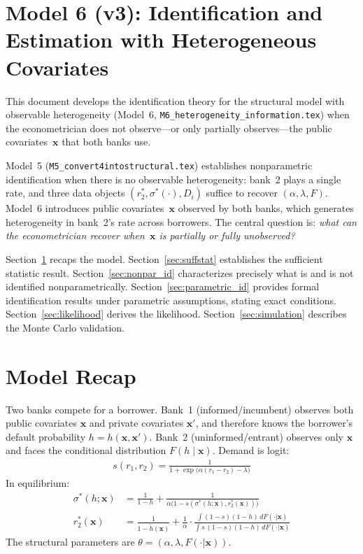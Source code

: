 \documentclass[12pt]{article}
\theoremstyle{plain}
\theoremstyle{plain}
\theoremstyle{definition}  %
\theoremstyle{remark}  %
\begin{document}
\section*{Model 6 (v3): Identification and Estimation with Heterogeneous Covariates}

This document develops the identification theory for the structural model with observable heterogeneity (Model~6, \texttt{M6\_heterogeneity\_information.tex}) when the econometrician does not observe---or only partially observes---the public covariates~$\mathbf{x}$ that both banks use.

Model~5 (\texttt{M5\_convert4intostructural.tex}) establishes nonparametric identification when there is no observable heterogeneity: bank~2 plays a single rate, and three data objects $(r_2^*, \sigma^*(\cdot), D_i)$ suffice to recover $(\alpha, \lambda, F)$.  Model~6 introduces public covariates~$\mathbf{x}$ observed by both banks, which generates heterogeneity in bank~2's rate across borrowers.  The central question is: \emph{what can the econometrician recover when~$\mathbf{x}$ is partially or fully unobserved?}

Section~\ref{sec:recap} recaps the model. Section~\ref{sec:suffstat} establishes the sufficient statistic result.  Section~\ref{sec:nonpar_id} characterizes precisely what is and is not identified nonparametrically.  Section~\ref{sec:parametric_id} provides formal identification results under parametric assumptions, stating exact conditions.  Section~\ref{sec:likelihood} derives the likelihood.  Section~\ref{sec:simulation} describes the Monte Carlo validation.



\section{Model Recap}\label{sec:recap}

Two banks compete for a borrower. Bank~1 (informed/incumbent) observes both public covariates $\mathbf{x}$ and private covariates $\mathbf{x}'$, and therefore knows the borrower's default probability $h = h(\mathbf{x}, \mathbf{x}')$. Bank~2 (uninformed/entrant) observes only $\mathbf{x}$ and faces the conditional distribution $F(h \mid \mathbf{x})$. Demand is logit:
\begin{align}\label{eq:share}
    s(r_1, r_2) = \frac{1}{1 + \exp\!\big(\alpha(r_1 - r_2) - \lambda\big)}
\end{align}
In equilibrium:
\begin{align}
    \sigma^*(h;\mathbf{x}) &= \frac{1}{1-h} + \frac{1}{\alpha\big(1-s(\sigma^*(h;\mathbf{x}), r_2^*(\mathbf{x}))\big)} \label{eq:sigma}\\[4pt]
    r_2^*(\mathbf{x}) &= \frac{1}{1 - \tilde{h}(\mathbf{x})} + \frac{1}{\alpha}\cdot\frac{\int (1-s)(1-h)\, dF(\cdot|\mathbf{x})}{\int s\,(1-s)(1-h)\, dF(\cdot|\mathbf{x})} \label{eq:r2}
\end{align}
The structural parameters are $\theta = (\alpha, \lambda, F(\cdot|\mathbf{x}))$.
\end{document}
